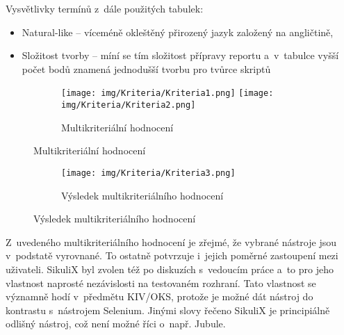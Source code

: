 Vysvětlivky termínů z~dále použitých tabulek:
\begin{itemize}
	\item Natural-like -- víceméně okleštěný přirozený jazyk založený na angličtině,
	\item Složitost tvorby -- míní se tím složitost přípravy reportu a~v~tabulce vyšší počet bodů znamená jednodušší tvorbu pro tvůrce skriptů
\end{itemize}
\begin{figure}[ht!]
	\begin{subfigure}{\textwidth}
		\centering
		\texttt{[image: img/Kriteria/Kriteria1.png]}
		\texttt{[image: img/Kriteria/Kriteria2.png]}
		\caption{Multikriteriální hodnocení}
		\label{MKHodn}
	\end{subfigure}
\end{figure}
\begin{figure}[ht!]
	\ContinuedFloat
	\begin{subfigure}{\textwidth}
		\centering
		\texttt{[image: img/Kriteria/Kriteria3.png]}
		\caption{Výsledek multikriteriálního hodnocení}
		\label{MKVysl}
	\end{subfigure}
\end{figure}

Z~uvedeného multikriteriálního hodnocení je zřejmé, že vybrané nástroje jsou v~podstatě vyrovnané. To ostatně potvrzuje i~jejich poměrné zastoupení mezi uživateli. SikuliX byl zvolen též po diskuzích s~vedoucím práce a~to pro jeho vlastnost naprosté nezávislosti na testovaném rozhraní. Tato vlastnost se významně hodí v~předmětu KIV/OKS, protože je možné dát nástroj do kontrastu s~nástrojem Selenium. Jinými slovy řečeno SikuliX je principiálně odlišný nástroj, což není možné říci o~např. Jubule.